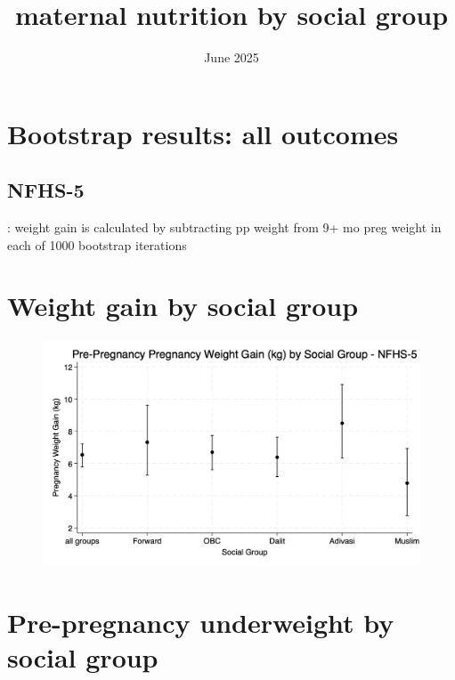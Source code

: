 \documentclass{article}
\title{maternal nutrition by social group}
\date{June 2025}
\begin{document}
\maketitle


\section{Bootstrap results: all outcomes}


\subsection{NFHS-5}
\begin{table}[H]
    \centering
    \footnotesize %
    \label{tab:sumstat}
    \caption{: weight gain is calculated by subtracting pp weight from 9+ mo preg weight in each of 1000 bootstrap iterations}
\end{table}

\section{Weight gain by social group}

\begin{figure}[H]
    \centering
    \includegraphics[width=\textwidth]{figures/bootstrapped_gainhat_by_group.png}
\end{figure}

\section{Pre-pregnancy underweight by social group}
\end{document}
